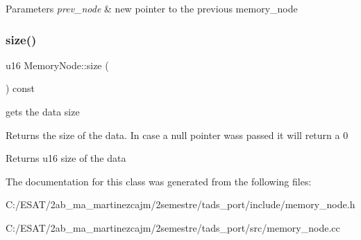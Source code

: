 \begin{DoxyParams}{Parameters}
{\em prev\+\_\+node} & new pointer to the previous memory\+\_\+node \\
\hline
\end{DoxyParams}
\mbox{\label{class_memory_node_a2cce3c72a53570de651f43a9b8d0d023}} 
\subsubsection{\texorpdfstring{size()}{size()}}
{\footnotesize\ttfamily u16 Memory\+Node\+::size (\begin{DoxyParamCaption}{ }\end{DoxyParamCaption}) const}



gets the data size 

Returns the size of the data. In case a null pointer wass passed it will return a 0

\begin{DoxyReturn}{Returns}
u16 size of the data 
\end{DoxyReturn}


The documentation for this class was generated from the following files\+:\begin{DoxyCompactItemize}
\item 
C\+:/\+E\+S\+A\+T/2ab\+\_\+ma\+\_\+martinezcajm/2semestre/tads\+\_\+port/include/memory\+\_\+node.\+h\item 
C\+:/\+E\+S\+A\+T/2ab\+\_\+ma\+\_\+martinezcajm/2semestre/tads\+\_\+port/src/memory\+\_\+node.\+cc\end{DoxyCompactItemize}
